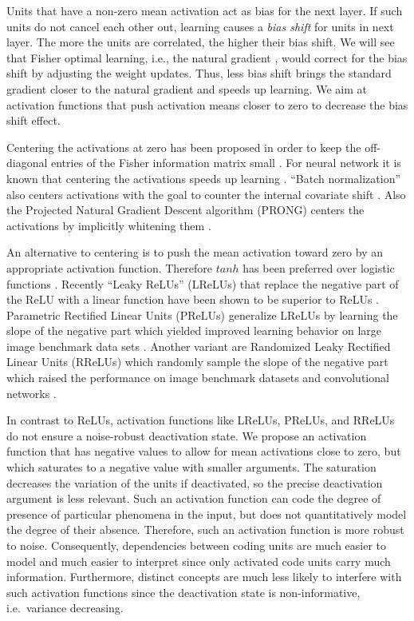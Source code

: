 \documentclass{article}
\begin{document}
Units that have a non-zero mean activation act as bias for
the next layer.
If such units do not cancel each other out,
learning causes a {\em bias shift} for units in next layer.
The more the units are correlated, the higher their bias shift.
We will see that Fisher optimal learning, i.e., the natural
gradient \citep{Amari:98},
would correct for the bias shift
by adjusting the weight updates.
Thus, less bias shift brings the standard gradient closer to
the natural gradient and speeds up learning.
We aim at activation functions that push activation means closer to zero
to decrease the bias shift effect.

Centering the activations at zero
has been proposed in order to keep the off-diagonal entries of the
Fisher information matrix small \citep{Raiko:12}.
For neural network it is known that centering the activations
speeds up learning \citep{LeCun:91,LeCun:98,Schraudolph:98}.
``Batch normalization'' also centers activations with the goal
to counter the internal covariate shift \citep{Ioffe:15}.
Also the Projected Natural Gradient Descent algorithm (PRONG)
centers the activations by implicitly whitening them
\citep{Desjardins:15}.


An alternative to centering is to push the mean activation toward zero by
an appropriate activation function.
Therefore $tanh$ has been preferred over
logistic functions \citep{LeCun:91,LeCun:98}.
Recently ``Leaky ReLUs'' (LReLUs)
that replace the negative part of the ReLU with a linear function
have been shown to be superior to ReLUs \citep{Maas:13}.
Parametric Rectified Linear Units (PReLUs) generalize LReLUs
by learning the slope of the negative part which yielded
improved learning behavior on large image benchmark data sets \citep{He:15}.
Another variant are
Randomized Leaky Rectified Linear Units (RReLUs) which randomly sample
the slope of the negative part which raised the performance on
image benchmark datasets and convolutional networks \citep{Xu:15}.

In contrast to ReLUs, activation functions like
LReLUs, PReLUs, and RReLUs do not
ensure a noise-robust deactivation state.
We propose an activation function that has negative
values to allow for mean activations close to zero,
but which saturates to a negative value with smaller arguments.
The saturation decreases the variation of the units if
deactivated, so the precise deactivation argument is less relevant.
Such an activation function can code the degree of presence of
particular phenomena in the input, but does
not quantitatively model the degree of their absence.
Therefore, such an activation function is more robust to noise.
Consequently, dependencies between
coding units are much easier to model and much easier to interpret
since only activated code units carry much information.
Furthermore, distinct concepts are much less likely to interfere with
such activation functions since the deactivation state is
non-informative, i.e.\ variance decreasing.
\end{document}

